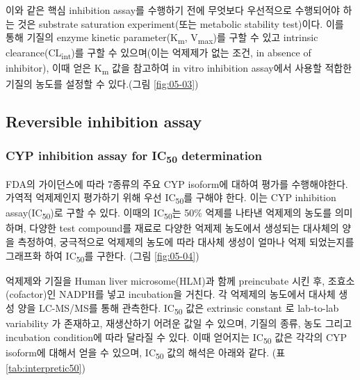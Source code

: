 \documentclass[
  11pt,
  krantz2, a4paper, twoside]{krantz}
\begin{document}
이와 같은 핵심 inhibition assay를 수행하기 전에 무엇보다 우선적으로 수행되어야 하는 것은 substrate saturation experiment(또는 metabolic stability test)이다. 이를 통해 기질의 enzyme kinetic parameter(K\textsubscript{m}, V\textsubscript{max})를 구할 수 있고 intrinsic clearance(CL\textsubscript{int})를 구할 수 있으며(이는 억제제가 없는 조건, in absence of inhibitor), 이때 얻은 K\textsubscript{m} 값을 참고하여 in vitro inhibition assay에서 사용할 적합한 기질의 농도를 설정할 수 있다.(그림 \ref{fig:05-03})

\hypertarget{reversible-inhibition-assay}{%
\subsection{Reversible inhibition assay}\label{reversible-inhibition-assay}}

\hypertarget{cyp-inhibition-assay-for-ic50-determination}{%
\subsubsection{\texorpdfstring{CYP inhibition assay for IC\textsubscript{50} determination}{CYP inhibition assay for IC50 determination}}\label{cyp-inhibition-assay-for-ic50-determination}}

FDA의 가이던스에 따라 7종류의 주요 CYP isoform에 대하여 평가를 수행해야한다. 가역적 억제제인지 평가하기 위해 우선 IC\textsubscript{50}를 구해야 한다. 이는 CYP inhibition assay(IC\textsubscript{50})로 구할 수 있다. 이때의 IC\textsubscript{50}는 50\% 억제를 나타낸 억제제의 농도를 의미하며, 다양한 test compound를 재료로 다양한 억제제 농도에서 생성되는 대사체의 양을 측정하여, 궁극적으로 억제제의 농도에 따라 대사체 생성이 얼마나 억제 되었는지를 그래프화 하여 IC\textsubscript{50}를 구한다. (그림 \ref{fig:05-04})

억제제와 기질을 Human liver microsome(HLM)과 함께 preincubate 시킨 후, 조효소(cofactor)인 NADPH를 넣고 incubation을 거친다. 각 억제제의 농도에서 대사체 생성 양을 LC-MS/MS를 통해 관측한다. IC\textsubscript{50} 값은 extrinsic constant 로 lab-to-lab variability 가 존재하고, 재생산하기 어려운 값일 수 있으며, 기질의 종류, 농도 그리고 incubation condition에 따라 달라질 수 있다. 이때 얻어지는 IC\textsubscript{50} 값은 각각의 CYP isoform에 대해서 얻을 수 있으며, IC\textsubscript{50} 값의 해석은 아래와 같다. (표 \ref{tab:interpretic50})
\end{document}
